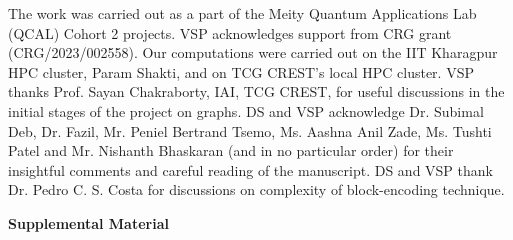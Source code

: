 \documentclass[%
 reprint,
 superscriptaddress,
 amsmath,amssymb,
 aps,
 pra,
floatfix,
nofootinbib,
]{revtex4-2}
\theoremstyle{definition}
\theoremstyle{remark}
\begin{document}
\begin{acknowledgments} 
The work was carried out as a part of the Meity Quantum Applications Lab (QCAL) Cohort 2 projects. VSP acknowledges support from CRG grant (CRG/2023/002558). Our computations were carried out on the IIT Kharagpur HPC cluster, Param Shakti, and on TCG CREST's local HPC cluster. VSP thanks Prof. Sayan Chakraborty, IAI, TCG CREST, for useful discussions in the initial stages of the project on graphs. DS and VSP acknowledge Dr. Subimal Deb, Dr. Fazil, Mr. Peniel Bertrand Tsemo, Ms. Aashna Anil Zade, Ms. Tushti Patel and Mr. Nishanth Bhaskaran (and in no particular order) for their insightful comments and careful reading of the manuscript. DS and VSP thank Dr. Pedro C. S. Costa for discussions on complexity of block-encoding technique. 
\end{acknowledgments} 

\clearpage 

\begin{center}
     \Large \textbf{Supplemental Material} 
 \end{center} 
\end{document}
